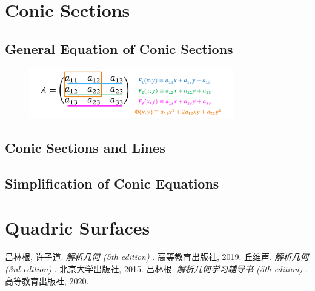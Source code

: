 \documentclass[11pt]{../../TexTemplate/elegantbook} %
\begin{document}
\chapter{Conic Sections}
\section{General Equation of Conic Sections}

\begin{figure}[h]
    \centering
    \includegraphics[width=0.8\textwidth]{img/ConicRelation.png}
\end{figure}

\section{Conic Sections and Lines}

\section{Simplification of Conic Equations}

\chapter{Quadric Surfaces}



\begin{thebibliography}{99} 
 吕林根, 许子道. \emph{解析几何 (5th edition) }. 高等教育出版社, 2019.
 丘维声. \emph{解析几何 (3rd edition) }. 北京大学出版社, 2015.
 吕林根. \emph{解析几何学习辅导书 (5th edition) }. 高等教育出版社, 2020.
\end{thebibliography}
\end{document}

